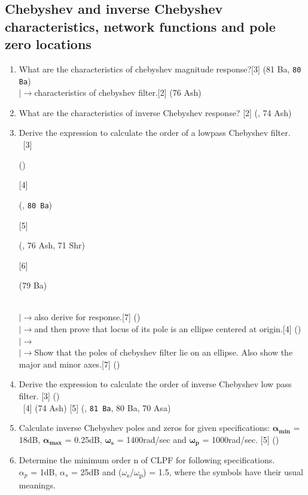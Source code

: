 \documentclass[12pt]{article}
\newcommand{\w}{\(\omega\)}
\newcommand{\lb}{\\$\left|\rightarrow\right.$}
\newcommand{\enter}{\\\textcolor{white}{1}}
\begin{document}
\subsection{Chebyshev and inverse Chebyshev characteristics, network functions and pole zero locations}
\begin{enumerate}
\item What are the characteristics of chebyshev magnitude response?\hfill [3] (81 Ba, \texttt{80 Ba})
\lb characteristics of chebyshev filter.\hfill[2] (76 Ash)

\item What are the characteristics of inverse Chebyshev response? \hfill [2] (, 74 Ash)

\item Derive the expression to calculate the order of a lowpass Chebyshev filter.
\enter\hfill[3] \begin{small}()\end{small} [4] \begin{small}(, \texttt{80 Ba})\end{small} [5] \begin{small}(, 76 Ash, 71 Shr)\end{small} [6] \begin{small}(79 Ba)\end{small}
\lb  also derive for response.\hfill[7] ()
\lb and then prove that locus of its pole is an ellipse centered at origin.\hfill[4] ()
\lb\lb Show that the poles of chebyshev filter lie on an ellipse. Also show the major and minor axes.\hfill[7] ()

\item Derive the expression to calculate the order of inverse Chebyshev low pass filter. \hfill [3] ()
\enter \hfill[4] (74 Ash) [5] (, \texttt{81 Ba}, 80 Ba, 70 Asa)

\item Calculate inverse Chebyshev poles and zeros for given specifications: $\boldsymbol{\alpha_{min}}$ = 18dB, $\boldsymbol{\alpha_{max}}$ = 0.25dB, $\boldsymbol{\omega_s}$ = 1400rad/sec and $\boldsymbol{\omega_p}$ = 1000rad/sec. \hfill [5] ()

\item Determine the  minimum order n of CLPF for following specifications.\\
$\alpha_p$ = 1dB, $\alpha_s$ = 25dB and (\w\textsubscript{s}/\w\textsubscript{p}) = 1.5, where the symbols have their usual meanings.


\end{enumerate}
\end{document}
